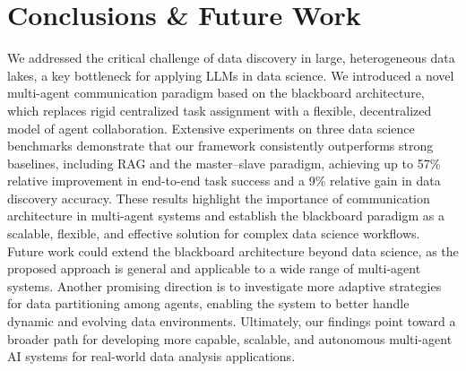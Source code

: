 \section{Conclusions \& Future Work}

We addressed the critical challenge of data discovery in large, heterogeneous data lakes, a key bottleneck for applying LLMs in data science. We introduced a novel multi-agent communication paradigm based on the blackboard architecture, which replaces rigid centralized task assignment with a flexible, decentralized model of agent collaboration. Extensive experiments on three data science benchmarks demonstrate that our framework consistently outperforms strong baselines, including RAG and the master–slave paradigm, achieving up to 57\% relative improvement in end-to-end task success and a 9\% relative gain in data discovery accuracy. These results highlight the importance of communication architecture in multi-agent systems and establish the blackboard paradigm as a scalable, flexible, and effective solution for complex data science workflows. Future work could extend the blackboard architecture beyond data science, as the proposed approach is general and applicable to a wide range of multi-agent systems. Another promising direction is to investigate more adaptive strategies for data partitioning among agents, enabling the system to better handle dynamic and evolving data environments. Ultimately, our findings point toward a broader path for developing more capable, scalable, and autonomous multi-agent AI systems for real-world data analysis applications.
